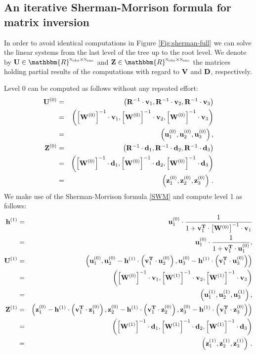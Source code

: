 \documentclass[12pt]{article}
\newcommand{\inv}[1]{\left[{\bf W^{(\rm #1)}}\right]^{\rm -1}}
\newcommand{\Nobs}{\textsc{n}_{{\rm obs}}}
\newcommand{\Nens}{\textsc{n}_{{\rm ens}}}
\newcommand{\R}{{\bf R}}
\newcommand{\Z}{{\bf Z}}
\newcommand{\sZ}[1]{{\bf Z}^{\left(\rm #1 \right)}}
\newcommand{\h}[1]{{\bf h}^{\left( \rm #1\right)}}
\newcommand{\U}[1]{{\bf U}^{\left ( \rm #1 \right)}}
\renewcommand{\u}[2]{{\bf u}_{\rm #1}^{(\rm #2)}}
\newcommand{\sz}[2]{{\bf z}_{\rm #1}^{(\rm #2)}}
\newcommand{\D}{{\bf D}}
\renewcommand{\d}[1]{{\bf d}_{\rm #1}}
\newcommand{\V}{{\bf V}}
\renewcommand{\v}[1]{{\bf v}_{{\rm #1}}}
\renewcommand{\Re}{\mathbbm{R}}
\newcommand{\invS}[1]{ {#1^{-1}}}
\begin{document}
\subsection{An iterative Sherman-Morrison formula for matrix inversion}
\label{Sec:IterativeShermanMorrison}


In order to avoid identical computations  in Figure \ref{Fig:sherman-full} we can solve the linear systems from the last level of the tree up to the root level. We denote by ${\bf U} \in \Re^{\Nobs \times \Nens}$ and $\Z \in \Re^{\Nobs \times \Nens}$ the matrices holding partial results of the computations with regard to $\V$ and $\D$, respectively. 

Level $0$ can be computed as follows without any repeated effort: 
\begin{eqnarray} \nonumber
\displaystyle \U{0} &=& \left( \invS{\R} \cdot \v{1},\invS{\R} \cdot \v{2},\invS{\R} \cdot \v{3}\right ) \\ \nonumber
&=& \left( \inv{0} \cdot \v{1},\inv{0} \cdot \v{2},\inv{0} \cdot \v{3}\right ) \\ \nonumber
&=& \left( \u{1}{0},\u{2}{0},\u{3}{0}\right ), \\ \nonumber
\sZ{0} &=& \left( \invS{\R} \cdot \d{1},\invS{\R} \cdot \d{2},\invS{\R} \cdot \d{3}\right ) \\ \nonumber
&=& \left( \inv{0} \cdot \d{1},\inv{0} \cdot \d{2},\inv{0} \cdot \d{3}\right ) \\ \nonumber
&=& \left( \sz{1}{0},\sz{2}{0},\sz{3}{0}\right )\,. 
\end{eqnarray}
We make use of the Sherman-Morrison formula \eqref{SWM} and compute level 1 as follows:
\begin{eqnarray} \nonumber
\displaystyle \h{1} &=& \u{1}{0} \cdot \frac{1}{1+\v{1}^{\bf T} \cdot \inv{0} \cdot \v{1} } \\ \nonumber
&=& \u{1}{0} \cdot \frac{1}{1+\v{1}^{\bf T} \cdot \u{1}{0} }, \\ \nonumber
 \U{1} &=& \left( \u{1}{0}, \u{2}{0}-\h{1} \cdot \left( \v{1}^{\bf T} \cdot \u{2}{0} \right ), \u{3}{0}-\h{1} \cdot \left( \v{1}^{\bf T} \cdot \u{3}{0} \right )\right) \\ \nonumber
 &=& \left( \inv{0} \cdot \v{1},\inv{1} \cdot \v{2},\inv{1} \cdot \v{3}\right ) \\ \nonumber 
 &=& \left( \u{1}{1}, \u{2}{1}, \u{3}{1}\right), \\ \nonumber
 \sZ{1} &=& \left( \sz{1}{0}-\h{1} \cdot \left( \v{1}^{\bf T} \cdot \sz{1}{0}\right),\sz{2}{0}-\h{1} \cdot \left( \v{1}^{\bf T} \cdot \sz{2}{0}\right),\sz{3}{0}-\h{1} \cdot \left( \v{1}^{\bf T} \cdot \sz{3}{0}\right) \right ) \\ \nonumber
 &=& \left( \inv{1} \cdot \d{1},\inv{1} \cdot \d{2},\inv{1} \cdot \d{3}\right ) \\ \nonumber 
 &=& \left( \sz{1}{1},\sz{2}{1},\sz{3}{1} \right)\,.
\end{eqnarray}
\end{document}
